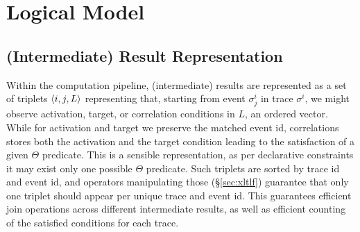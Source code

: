 \section{Logical Model}

\subsection{(Intermediate) Result Representation}
Within the computation pipeline, (intermediate) results are represented as a set of triplets $\braket{i,j,L}$ representing that, starting from event $\sigma^i_j$ in trace $\sigma^i$, we might observe activation, target, or correlation conditions in $L$, an ordered vector.  While for activation and target %
we %
preserve 
the matched event id,
correlations stores
both the activation and the target condition leading to the satisfaction of a given $\Theta$ predicate. This is a sensible representation, as per declarative constraints it may exist only one possible $\Theta$ predicate. Such triplets are sorted by trace id and event id, and operators manipulating those (\S\ref{sec:xltlf}) guarantee that only one triplet should appear per unique trace and event id. This guarantees efficient join operations across different intermediate results, as well as efficient counting of the satisfied conditions for each trace. %
